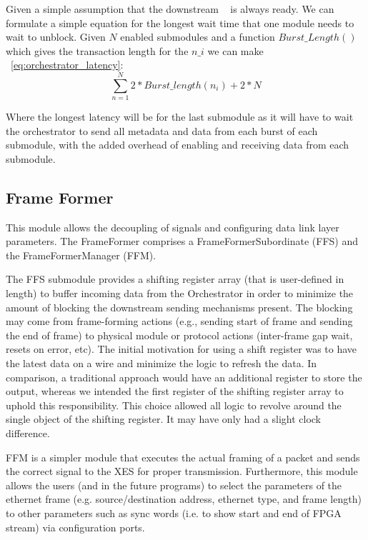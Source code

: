 Given a simple assumption that the downstream \axistream~ is always ready. We can formulate a simple equation for the longest wait time that one module needs to wait to unblock. Given $N$ enabled submodules and a function $Burst\_Length()$ which gives the transaction length for the  $n\_i$  we can make ~\ref*{eq:orchestrator_latency}:
\begin{equation}
    \sum_{n=1}^N 2*Burst\_length(n_i)+2*N
    \label{eq:orchestrator_latency}
\end{equation}

Where the longest latency will be for the last submodule as it will have to wait the orchestrator to send all metadata and data from each burst of each submodule, with the added overhead of enabling and receiving data from each submodule.


\subsection{Frame Former}
This module allows the decoupling of signals and configuring data link layer parameters. The FrameFormer comprises a FrameFormerSubordinate (FFS) and the FrameFormerManager (FFM). 

The FFS submodule provides a shifting register array (that is user-defined in length) to buffer incoming data from the Orchestrator in order to minimize the amount of blocking the downstream sending mechanisms present. The blocking may come from frame-forming actions (e.g., sending start of frame and sending the end of frame) to physical module or protocol actions (inter-frame gap wait, resets on error, etc). 
The initial motivation for using a shift register was to have the latest data on a wire and minimize the logic to refresh the data. In comparison, a traditional approach would have an additional register to store the output, whereas we intended the first register of the shifting register array to uphold this responsibility. This choice allowed all logic to revolve around the single object of the shifting register. It may have only had a slight clock difference. %

FFM is a simpler module that executes the actual framing of a packet and sends the correct signal to the XES for proper transmission. Furthermore, this module allows the users (and in the future programs) to select the parameters of the ethernet frame (e.g. source/destination address, ethernet type, and frame length) to other parameters such as sync words (i.e. to show start and end of FPGA stream) via configuration ports. 

